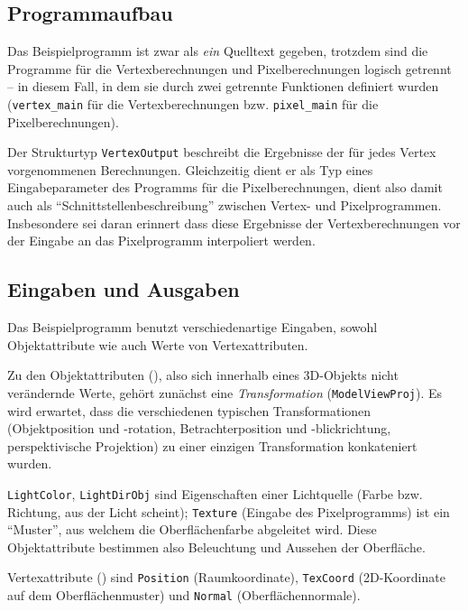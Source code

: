 \documentclass[twoside,a4paper,fleqn,12pt]{book}
\begin{document}
\subsection{Programmaufbau}

Das Beispielprogramm ist zwar als \emph{ein} Quelltext gegeben, trotzdem sind die Programme für die Vertexberechnungen
und Pixelberechnungen logisch getrennt -- in diesem Fall, in dem sie durch zwei getrennte Funktionen definiert wurden
(\verb+vertex_main+ für die Vertexberechnungen bzw. \verb+pixel_main+ für die Pixelberechnungen).

Der Strukturtyp \verb+VertexOutput+ beschreibt die Ergebnisse der für jedes Vertex vorgenommenen Berechnungen.
Gleichzeitig dient er als Typ eines Eingabeparameter des Programms für die Pixelberechnungen, dient also damit
auch als "`Schnittstellenbeschreibung"' zwischen Vertex- und Pixelprogrammen. Insbesondere sei daran erinnert
dass diese Ergebnisse der Vertexberechnungen vor der Eingabe an das Pixelprogramm interpoliert werden.

\subsection{Eingaben und Ausgaben}

Das Beispielprogramm benutzt verschiedenartige Eingaben, sowohl Objektattribute wie auch Werte von Vertexattributen.

Zu den Objektattributen (), also sich innerhalb eines 3D-Objekts nicht verändernde Werte,
gehört zunächst eine \emph{Transformation} (\verb+ModelViewProj+). Es wird erwartet, dass die verschiedenen typischen Transformationen
(Objektposition und -rotation, Betrachterposition und -blickrichtung, perspektivische Projektion) zu einer einzigen Transformation konkateniert wurden.

\verb+LightColor+, \verb+LightDirObj+ sind Eigenschaften einer Lichtquelle (Farbe bzw. Richtung, aus der Licht scheint);
\verb+Texture+ (Eingabe des Pixelprogramms) ist ein "`Muster"', aus welchem die Oberflächenfarbe abgeleitet wird.
Diese Objektattribute bestimmen also Beleuchtung und Aussehen der Oberfläche.


Vertexattribute () sind \verb+Position+ (Raumkoordinate), \verb+TexCoord+ (2D-Koordinate auf dem Oberflächenmuster)
und \verb+Normal+ (Oberflächennormale).
\end{document}
